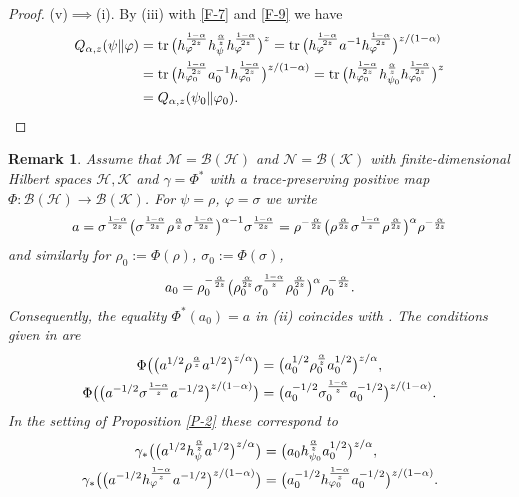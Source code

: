 \documentclass[11pt,reqno]{article}
\newtheorem{remark}[thm]{Remark}
\numberwithin{equation}{section}
\def\cM{\mathcal{M}}
\def\cH{\mathcal{H}}
\def\cN{\mathcal{N}}
\def\cB{\mathcal{B}}
\def\cK{\mathcal{K}}
\def\tr{\mathrm{tr}\,}
\def\ffi{\varphi}
\begin{document}
\begin{proof}
(v)$\implies$(i).\enspace
By (iii) with \eqref{F-7} and \eqref{F-9} we have
\begin{align*}
Q_{\alpha,z}(\psi\|\ffi)
&=\tr\bigl(h_\ffi^{1-\alpha\over2z}h_\psi^{\alpha\over z}h_\ffi^{1-\alpha\over2z}\bigr)^z
=\tr\bigl(h_\ffi^{1-\alpha\over2z}a^{-1}h_\ffi^{1-\alpha\over2z}\bigr)^{z/(1-\alpha)} \\
&=\tr\bigl(h_{\ffi_0}^{1-\alpha\over2z}a_0^{-1}h_{\ffi_0}^{1-\alpha\over2z}\bigr)^{z/(1-\alpha)}
=\tr\bigl(h_{\ffi_0}^{1-\alpha\over2z}h_{\psi_0}^{\alpha\over z}h_{\ffi_0}^{1-\alpha\over2z}\bigr)^z \\
&=Q_{\alpha,z}(\psi_0\|\ffi_0).
\end{align*}
\end{proof}

\begin{remark}\rm
Assume that $\cM=\cB(\cH)$ and $\cN=\cB(\cK)$ with finite-dimensional Hilbert spaces $\cH,\cK$ and
$\gamma=\Phi^*$ with a trace-preserving positive map $\Phi:\cB(\cH)\to\cB(\cK)$. For $\psi=\rho$, $\ffi=\sigma$
we write
\[
a=\sigma^{1-\alpha\over2z}\bigl(\sigma^{1-\alpha\over2z}\rho^{\alpha\over z}
\sigma^{1-\alpha\over2z}\bigr)^{\alpha-1}\sigma^{1-\alpha\over2z}
=\rho^{-{\alpha\over2z}}\bigl(\rho^{\alpha\over2z}\sigma^{1-\alpha\over z}
\rho^{\alpha\over2z}\bigr)^\alpha\rho^{-{\alpha\over2z}}
\]
and similarly for $\rho_0:=\Phi(\rho)$, $\sigma_0:=\Phi(\sigma)$,
\[
a_0=\rho_0^{-{\alpha\over2z}}\bigl(\rho_0^{\alpha\over2z}\sigma_0^{1-\alpha\over z}
\rho_0^{\alpha\over2z}\bigr)^\alpha\rho_0^{-{\alpha\over2z}}.
\]
Consequently, the equality $\Phi^*(a_0)=a$ in (ii) coincides with \cite[Theorem I.2\,(2)]{Zh}. The conditions
given in \cite[Theorem I.2\,(3) and (4)]{Zh} are
\begin{align*}
\Phi\bigl(\bigl(a^{1/2}\rho^{\alpha\over z}a^{1/2}\bigr)^{z/\alpha}\bigr)
&=\bigl(a_0^{1/2}\rho_0^{\alpha\over z}a_0^{1/2}\bigr)^{z/\alpha}, \\
\Phi\bigl(\bigl(a^{-1/2}\sigma^{1-\alpha\over z}a^{-1/2}\bigr)^{z/(1-\alpha)}\bigr)
&=\bigl(a_0^{-1/2}\sigma_0^{1-\alpha\over z}a_0^{-1/2}\bigr)^{z/(1-\alpha)}.
\end{align*}
In the setting of Proposition \ref{P-2} these correspond to
\begin{align}
\gamma_*\bigl(\bigl(a^{1/2}h_\psi^{\alpha\over z}a^{1/2}\bigr)^{z/\alpha}\bigr)
&=\bigl(a_0h_{\psi_0}^{\alpha\over z}a_0^{1/2}\bigr)^{z/\alpha}, \label{F-13}\\
\gamma_*\bigl(\bigl(a^{-1/2}h_\ffi^{1-\alpha\over z}a^{-1/2}\bigr)^{z/(1-\alpha)}\bigr)
&=\bigl(a_0^{-1/2}h_{\ffi_0}^{1-\alpha\over z}a_0^{-1/2}\bigr)^{z/(1-\alpha)}. \label{F-14}

\end{align}
\end{remark}
\end{document}

